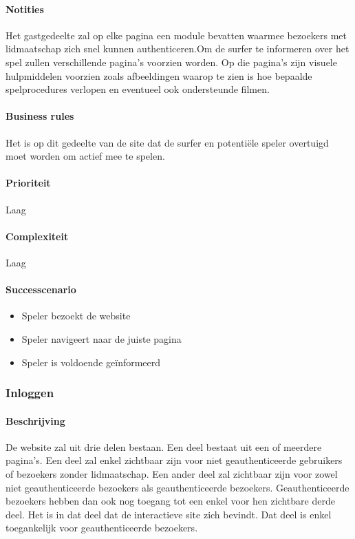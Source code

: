 \paragraph{Notities} Het gastgedeelte zal op elke pagina een module bevatten waarmee bezoekers met lidmaatschap zich snel kunnen authenticeren.\small{Om de surfer te informeren over het spel zullen verschillende pagina's voorzien worden. Op die pagina's zijn visuele hulpmiddelen voorzien zoals afbeeldingen waarop te zien is hoe bepaalde spelprocedures verlopen en eventueel ook ondersteunde filmen.}
\paragraph{Business rules}Het is op dit gedeelte van de site dat de surfer en potentiële speler overtuigd moet worden om actief mee te spelen.
\paragraph{Prioriteit}Laag
\paragraph{Complexiteit}Laag
\paragraph{Successcenario}
\begin{itemize}
 \item Speler bezoekt de website
 \item Speler navigeert naar de juiste pagina
 \item Speler is voldoende geïnformeerd
\end{itemize}

\subsubsection{Inloggen}
\paragraph{Beschrijving} De website zal uit drie delen bestaan. Een deel bestaat uit een of meerdere pagina's. Een deel zal enkel zichtbaar zijn voor niet geauthenticeerde gebruikers of bezoekers zonder lidmaatschap. Een ander deel zal zichtbaar zijn voor zowel niet geauthenticeerde bezoekers als geauthenticeerde bezoekers. Geauthenticeerde bezoekers hebben dan ook nog toegang tot een enkel voor hen zichtbare derde deel. Het is in dat deel dat de interactieve site zich bevindt. Dat deel is enkel toegankelijk voor geauthenticeerde bezoekers.
